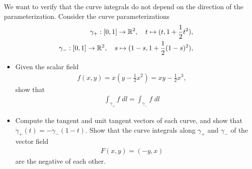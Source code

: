 \documentclass[11pt]{article}
\begin{document}
\begin{exercise}
    We want to verify that the curve integrals do not depend on the direction of the parameterization.
    Consider the curve parameterizations
    \begin{align}
        \gamma_+ : [0,1] \rightarrow \mathbb{R}^2, \quad t \mapsto ( t, 1 + \frac 1 2 t^2 ),
        \\
        \gamma_- : [0,1] \rightarrow \mathbb{R}^2, \quad s \mapsto ( 1-s, 1 + \frac 1 2 (1-s)^2 ),
    \end{align}
    \begin{itemize}
     \item Given the scalar field 
     \begin{align*}
        f(x,y) 
        = x ( y - \frac 1 2 x^2 )
        = x y - \frac 1 2 x^3
        ,
     \end{align*}
     show that 
     \begin{align}
        \int_{\gamma_+} f \;dl = \int_{\gamma_-} f \;dl
     \end{align}
     \item Compute the tangent and unit tangent vectors of each curve,
     and show that $\dot\gamma_+(t) = - \dot\gamma_-(1-t)$.
     Show that the curve integrals along $\gamma_+$ and $\gamma_-$ of the vector field
     \begin{align}
        F(x,y) = (-y,x)
     \end{align}
     are the negative of each other.
    \end{itemize}
\end{exercise}
\end{document}
